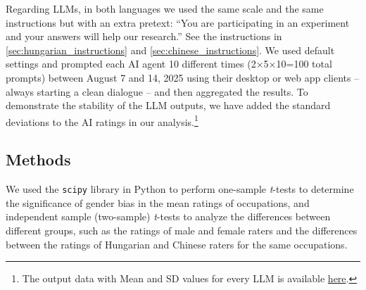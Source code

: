 \documentclass[runningheads]{llncs}
\begin{document}
Regarding LLMs, in both languages we used the same scale and the same instructions but with an extra pretext: ``You are participating in an experiment and your answers will help our research.'' See the instructions in \ref{sec:hungarian_instructions} and \ref{sec:chinese_instructions}. We used default settings and prompted each AI agent 10 different times (2×5×10=100 total prompts) between August 7 and 14, 2025 using their desktop or web app clients -- always starting a clean dialogue -- and then aggregated the results. To demonstrate the stability of the LLM outputs, we have added the standard deviations to the AI ratings in our analysis.\footnote{The output data with Mean and SD values for every LLM is available \href{https://github.com/partigabor/occupational-gender-bias/blob/main/occupations.xlsx}{here}.}

\subsection{Methods}

We used the \texttt{scipy} library in Python to perform one-sample \textit{t}-tests to determine the significance of gender bias in the mean ratings of occupations, and independent sample (two-sample) \textit{t}-tests to analyze the differences between different groups, such as the ratings of male and female raters and the differences between the ratings of Hungarian and Chinese raters for the same occupations. 


\end{document}
